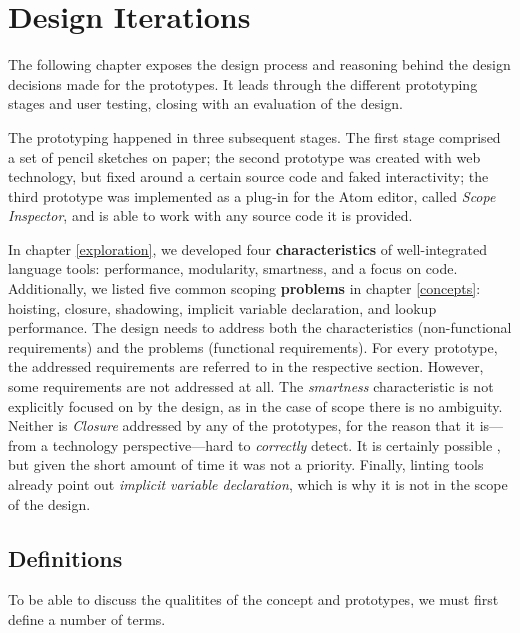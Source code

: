 \chapter{Design Iterations}\label{design}

The following chapter exposes the design process and reasoning behind
the design decisions made for the prototypes. It leads through the
different prototyping stages and user testing, closing with an
evaluation of the design.

The prototyping happened in three subsequent stages. The first stage
comprised a set of pencil sketches on paper; the second prototype was
created with web technology, but fixed around a certain source code and
faked interactivity; the third prototype was implemented as a plug-in
for the Atom editor, called \emph{Scope Inspector}, and is able to work
with any source code it is provided.

In chapter \ref{exploration}, we developed four \textbf{characteristics}
of well-integrated language tools: performance, modularity, smartness,
and a focus on code. Additionally, we listed five common scoping
\textbf{problems} in chapter \ref{concepts}: hoisting, closure,
shadowing, implicit variable declaration, and lookup performance. The
design needs to address both the characteristics (non-functional
requirements) and the problems (functional requirements). For every
prototype, the addressed requirements are referred to in the respective
section. However, some requirements are not addressed at all. The
\emph{smartness} characteristic is not explicitly focused on by the
design, as in the case of scope there is no ambiguity. Neither is
\emph{Closure} addressed by any of the prototypes, for the reason that
it is—from a technology perspective—hard to \emph{correctly} detect. It
is certainly possible , but given the short amount of time it was not a
priority. Finally, linting tools already point out \emph{implicit
variable declaration}, which is why it is not in the scope of the
design.

\section{Definitions}\label{definitions}

To be able to discuss the qualitites of the concept and prototypes, we
must first define a number of terms.

